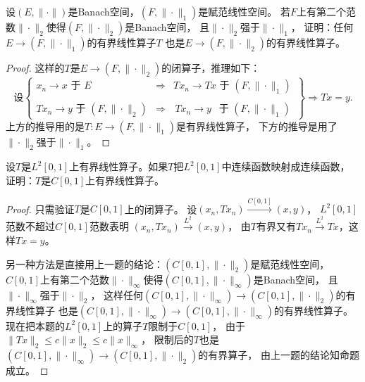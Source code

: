 \begin{13}
    设$(E,\|\cdot\|)$是Banach空间，$(F,\|\cdot\|_1)$是赋范线性空间。
    若$F$上有第二个范数$\|\cdot\|_2$使得$(F,\|\cdot\|_2)$是Banach空间，
    且$\|\cdot\|_2$强于$\|\cdot\|_1$，
    证明：任何$E\to(F,\|\cdot\|_1)$的有界线性算子$T$
    也是$E\to(F,\|\cdot\|_2)$的有界线性算子。
\end{13}
\begin{proof}
    这样的$T$是$E\to(F,\|\cdot\|_2)$的闭算子，推理如下：
    \[\text{设}\begin{Bmatrix}x_n \to x\text{ 于 }E\qquad\ \ \ &\Longrightarrow&Tx_n \to Tx\text{ 于 }(F,\|\cdot\|_1)\\
    &&\\Tx_n \to y\text{ 于 }(F,\|\cdot\|_2)&\Longrightarrow&\,Tx_n \to y\ \ \text{ 于 }(F,\|\cdot\|_1)\,\end{Bmatrix}
    \Longrightarrow Tx=y.\]
    上方的推导用的是$T\colon E\to(F,\|\cdot\|_1)$是有界线性算子，
    下方的推导是用了$\|\cdot\|_2$强于$\|\cdot\|_1$。
\end{proof}

\begin{14}
    设$T$是$L^2[0,1]$上有界线性算子。如果$T$把$L^2[0,1]$中连续函数映射成连续函数，
    证明：$T$是$C[0,1]$上有界线性算子。
\end{14}
\begin{proof}
    只需验证$T$是$C[0,1]$上的闭算子。
    设$(x_n,Tx_n)\stackrel{C[0,1]}{\longrightarrow}(x,y)$，
    $L^2[0,1]$范数不超过$C[0,1]$范数表明
    $(x_n,Tx_n)\stackrel{L^2}{\longrightarrow}(x,y)$，
    由$T$有界又有$Tx_n\stackrel{L^2}{\longrightarrow}Tx$，这样$Tx=y$。

    另一种方法是直接用上一题的结论：$(C[0,1],\|\cdot\|_2)$是赋范线性空间，
    $C[0,1]$上有第二个范数$\|\cdot\|_\infty$使得$(C[0,1],\|\cdot\|_\infty)$是Banach空间，
    且$\|\cdot\|_\infty$强于$\|\cdot\|_2$，
    这样任何$(C[0,1],\|\cdot\|_\infty)\to(C[0,1],\|\cdot\|_2)$的有界线性算子
    也是$(C[0,1],\|\cdot\|_\infty)\to(C[0,1],\|\cdot\|_\infty)$的有界线性算子。
    现在把本题的$L^2[0,1]$上的算子$T$限制于$C[0,1]$，
    由于$\|Tx\|_2 \leqslant c\|x\|_2 \leqslant c\|x\|_\infty$，
    限制后的$T$也是$(C[0,1],\|\cdot\|_\infty)\to(C[0,1],\|\cdot\|_2)$的有界算子，
    由上一题的结论知命题成立。
\end{proof}

